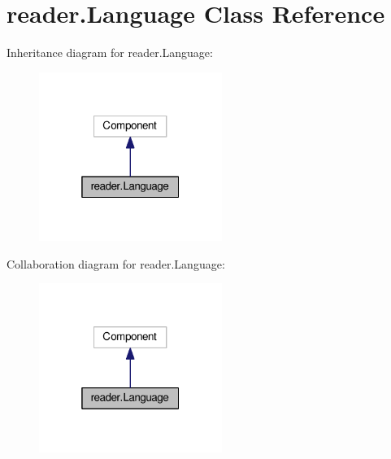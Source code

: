 \hypertarget{classreader_1_1Language}{}\section{reader.\+Language Class Reference}
\label{classreader_1_1Language}


Inheritance diagram for reader.\+Language\+:
\nopagebreak
\begin{figure}[H]
\begin{center}
\leavevmode
\includegraphics[width=169pt]{classreader_1_1Language__inherit__graph}
\end{center}
\end{figure}


Collaboration diagram for reader.\+Language\+:
\nopagebreak
\begin{figure}[H]
\begin{center}
\leavevmode
\includegraphics[width=169pt]{classreader_1_1Language__coll__graph}
\end{center}
\end{figure}
